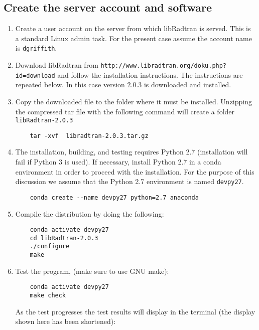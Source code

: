 \subsection{Create the server account and software}

\begin{enumerate}
\item Create a user account on the server from which libRadtran is served. This is a standard Linux admin task.  For the present case assume the account name is \lstinline{dgriffith}.

\item Download libRadtran from \lstinline{http://www.libradtran.org/doku.php?id=download} and follow the installation instructions. The instructions are repeated below.      In this case \libradtran{} version 2.0.3 is downloaded and installed.

\item Copy the downloaded file to the folder where it must be installed. Unzipping the compressed tar file with the following command will create a folder \lstinline{libRadtran-2.0.3}

\begin{lstlisting}
    tar -xvf  libradtran-2.0.3.tar.gz
\end{lstlisting}
\item The \libradtran{} installation, building, and testing requires Python 2.7 (installation will fail if Python 3 is used).  If necessary, install Python 2.7 in a conda environment in order to proceed with the \libradtran{} installation.  For the purpose of this discussion we assume that the Python 2.7 environment is named \lstinline{devpy27}.

\begin{lstlisting}
    conda create --name devpy27 python=2.7 anaconda
\end{lstlisting}

\item Compile the distribution by doing the following:

\begin{lstlisting}
    conda activate devpy27
    cd libRadtran-2.0.3
    ./configure
    make
\end{lstlisting}
\item Test the program, (make sure to use GNU make):

\begin{lstlisting}
    conda activate devpy27
    make check 
\end{lstlisting}
 As the test progresses the test results will display in the terminal (the display shown here has been shortened):



\end{enumerate}
